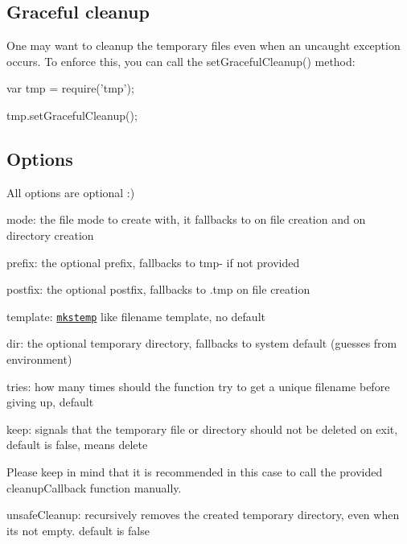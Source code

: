 \subsection*{Graceful cleanup}

One may want to cleanup the temporary files even when an uncaught exception occurs. To enforce this, you can call the {\ttfamily set\+Graceful\+Cleanup()} method\+:


\begin{DoxyCode}
var tmp = require('tmp');

tmp.setGracefulCleanup();
\end{DoxyCode}


\subsection*{Options}

All options are optional \+:)


\begin{DoxyItemize}
\item {\ttfamily mode}\+: the file mode to create with, it fallbacks to {} on file creation and {} on directory creation
\item {\ttfamily prefix}\+: the optional prefix, fallbacks to {\ttfamily tmp-\/} if not provided
\item {\ttfamily postfix}\+: the optional postfix, fallbacks to {\ttfamily .tmp} on file creation
\item {\ttfamily template}\+: \href{http://www.kernel.org/doc/man-pages/online/pages/man3/mkstemp.3.html}{\tt {\ttfamily mkstemp}} like filename template, no default
\item {\ttfamily dir}\+: the optional temporary directory, fallbacks to system default (guesses from environment)
\item {\ttfamily tries}\+: how many times should the function try to get a unique filename before giving up, default {}
\item {\ttfamily keep}\+: signals that the temporary file or directory should not be deleted on exit, default is {\ttfamily false}, means delete
\begin{DoxyItemize}
\item Please keep in mind that it is recommended in this case to call the provided {\ttfamily cleanup\+Callback} function manually.
\end{DoxyItemize}
\item {\ttfamily unsafe\+Cleanup}\+: recursively removes the created temporary directory, even when it\textquotesingle{}s not empty. default is {\ttfamily false} 
\end{DoxyItemize}